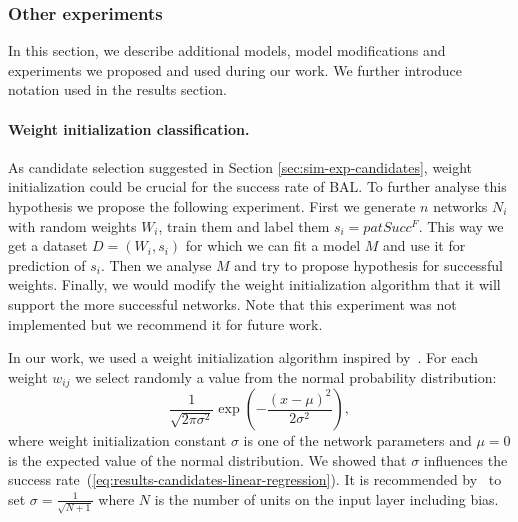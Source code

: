 \subsubsection{Other experiments}

In this section, we describe additional models, model modifications and experiments we proposed and used during our work. We further introduce notation used in the results section. 

\paragraph{Weight initialization classification.} 
\label{sec:our-weight-init-class}
As candidate selection suggested in Section \ref{sec:sim-exp-candidates}, weight initialization could be crucial for the success rate of BAL. To further analyse this hypothesis we propose the following experiment. First we generate $n$ networks $N_i$ with random weights $W_i$, train them and label them $s_i = patSucc^F$. This way we get a dataset $D=(W_i, s_i)$ for which we can fit a model $M$ and use it for prediction of $s_i$. Then we analyse $M$ and try to propose hypothesis for successful weights. Finally, we would modify the weight initialization algorithm that it will support the more successful networks. Note that this experiment was not implemented but we recommend it for future work. 

\label{sec:our-sigma} 

In our work, we used a weight initialization algorithm inspired by~\citet{o1996bio}. For each weight $w_{ij}$ we select randomly a value from the normal probability distribution:
\begin{equation} 
  \frac{1}{\sqrt{2\pi \sigma^2}} \exp\left({-\frac{(x-\mu)^2}{2\sigma^2}}\right),
  \label{eq:our-sigma} 
\end{equation} 
where weight initialization constant $\sigma$ is one of the network parameters and $\mu = 0$ is the expected value of the normal distribution. We showed that $\sigma$ influences the success rate~(\ref{eq:results-candidates-linear-regression}). It is recommended by~\citet{o1996bio} to set $\sigma=\frac{1}{\sqrt{N + 1}}$ where $N$ is the number of units on the input layer including bias.

